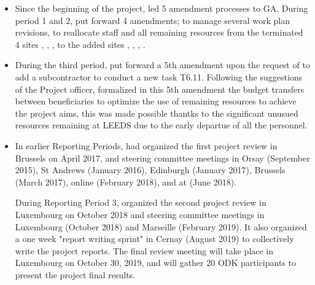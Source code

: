 \begin{itemize}
\item %

Since the beginning of the project,  led  5 amendment processes to GA. 
During period 1 and 2,  put forward 4 amendments; to manage several work 
plan revisions,  to reallocate staff and all remaining resources from the terminated 4 sites
 , , ,  to the added  sites , 
, , .
\item During the third period,  put forward a 5th amendment upon the request of 
to add a subcontractor to conduct a new task T6.11. Following the suggestions 
of the Project officer,  formalized in this 5th amendment the budget transfers
between beneficiaries to optimize the use of remaining resources to achieve the project 
aims, this was made possible thantks to the significant unusued resources remaining at 
LEEDS due to the early departue of all the personnel. 

\item In earlier Reporting Periods,  had organized the first
  project review in Brussels on April 2017, and steering committee
  meetings in Orsay (September 2015), St Andrews (January 2016),
  Edinburgh (January 2017), Brussels (March 2017), online (February
  2018), and at  (June 2018).

  During Reporting Period 3,  organized the second project
  review in Luxembourg on October 2018 and steering committee meetings
  in Luxembourg (October 2018) and Marseille (February 2019). It also
  organized a one week "report writing sprint" in Cernay (August 2019)
  to collectively write the project reports. The final review meeting
  will take place in Luxembourg on October 30, 2019, and will gather
  20 ODK participants to present the project final results.


\end{itemize}
